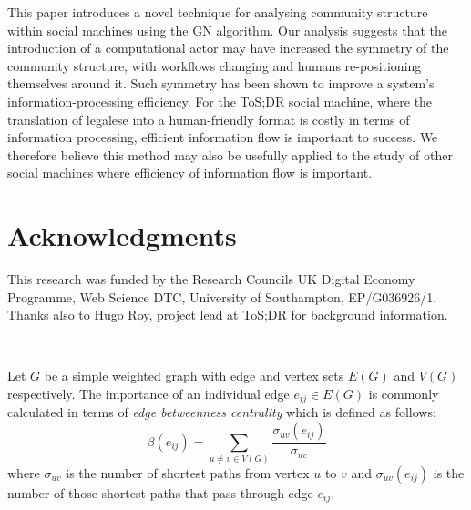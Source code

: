 \documentclass{sig-alternate}
\begin{document}
This paper introduces a novel technique for analysing community structure within social machines using the GN algorithm. Our analysis suggests that the introduction of a computational actor may have increased the symmetry of the community structure, with workflows changing and humans re-positioning themselves around it. Such symmetry has been shown to improve a system's information-processing efficiency. For the ToS;DR social machine, where the translation of legalese into a human-friendly format is costly in terms of information processing, efficient information flow is important to success. We therefore believe this method may also be usefully applied to the study of other social machines where efficiency of information flow is important.


\section{Acknowledgments}
This research was funded by the Research Councils UK Digital Economy Programme, Web Science DTC, University of Southampton, EP/G036926/1. Thanks also to Hugo Roy, project lead at ToS;DR for background information.

%

%
%
\
\label{Girvan and Newman Algorithm}

Let $G$ be a simple weighted graph with edge and vertex sets $E(G)$ and $V(G)$  respectively.  The importance of an individual edge $e_{ij} \in E(G)$ is commonly calculated in terms of \emph{edge betweenness centrality} which is defined as follows:
\[\beta(e_{ij}) = \sum_{ u\neq v \in V(G)} \frac{\sigma_{uv}(e_{ij})}{\sigma_{uv}}\]
where $\sigma_{uv}$ is the number of shortest paths from vertex $u$ to $v$ and $\sigma_{uv}(e_{ij})$ is the number of those shortest paths that pass through edge $e_{ij}$.  
\end{document}
